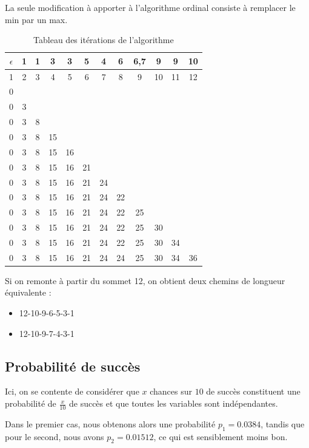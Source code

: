 \documentclass[paper=a4, fontsize=11pt]{scrartcl} %
\numberwithin{equation}{section} %
\numberwithin{figure}{section} %
\numberwithin{table}{section} %
\begin{document}
La seule modification à apporter à l'algorithme ordinal consiste à remplacer le min par un max. 


\begin{table}[htbp]
  \begin{center}
    \begin{tabular}{cccccccccccc}
      \hline
      $\epsilon$ & 1 & 1 & 3 & 3 & 5 & 4 & 6 & 6,7 & 9 & 9 & 10 \\
      \hline
      1 & 2 & 3 & 4 & 5 & 6 & 7 & 8 & 9 & 10 & 11 & 12 \\
      \hline
      0  \\
      0 & 3  \\
      0 & 3 & 8 \\
      0 & 3 & 8 & 15 \\
      0 & 3 & 8 & 15 & 16\\
      0 & 3 & 8 & 15 & 16 & 21 \\
      0 & 3 & 8 & 15 & 16 & 21 & 24\\
      0 & 3 & 8 & 15 & 16 & 21 & 24 & 22 \\
      0 & 3 & 8 & 15 & 16 & 21 & 24 & 22 & 25 \\
      0 & 3 & 8 & 15 & 16 & 21 & 24 & 22 & 25 & 30 \\
      0 & 3 & 8 & 15 & 16 & 21 & 24 & 22 & 25 & 30 & 34 \\
      0 & 3 & 8 & 15 & 16 & 21 & 24 & 24 & 25 & 30 & 34 & 36 \\
    \end{tabular}
  \end{center}
  \caption{Tableau des itérations de l'algorithme}
  \label{tab:fb}
\end{table}

Si on remonte à partir du sommet 12, on obtient deux chemins de longueur équivalente :
\begin{itemize}
\item 12-10-9-6-5-3-1
\item 12-10-9-7-4-3-1
\end{itemize}

\subsection{Probabilité de succès}

Ici, on se contente de considérer que $x$ chances sur $10$ de succès constituent une probabilité de $\frac{x}{10}$ de succès et que toutes les variables sont indépendantes. 

Dans le premier cas, nous obtenons alors une probabilité $p_1=0.0384$, tandis que pour le second, nous avons $p_2 = 0.01512$, ce qui est sensiblement moins bon. 
\end{document}
